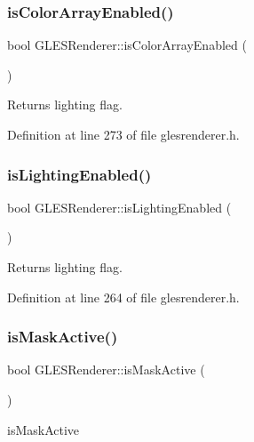 \subsubsection{\texorpdfstring{isColorArrayEnabled()}{isColorArrayEnabled()}}
{\footnotesize\ttfamily bool G\+L\+E\+S\+Renderer\+::is\+Color\+Array\+Enabled (\begin{DoxyParamCaption}{ }\end{DoxyParamCaption})\hspace{0.3cm}{\ttfamily [inline]}}

Returns lighting flag. 

Definition at line 273 of file glesrenderer.\+h.

\mbox{\label{class_g_l_e_s_renderer_a72a9b248926c08a45dfea70b8f0e22ca}} 
\subsubsection{\texorpdfstring{isLightingEnabled()}{isLightingEnabled()}}
{\footnotesize\ttfamily bool G\+L\+E\+S\+Renderer\+::is\+Lighting\+Enabled (\begin{DoxyParamCaption}{ }\end{DoxyParamCaption})\hspace{0.3cm}{\ttfamily [inline]}}

Returns lighting flag. 

Definition at line 264 of file glesrenderer.\+h.

\mbox{\label{class_g_l_e_s_renderer_a256990132d3f0ceff02a369db1361c2c}} 
\subsubsection{\texorpdfstring{isMaskActive()}{isMaskActive()}}
{\footnotesize\ttfamily bool G\+L\+E\+S\+Renderer\+::is\+Mask\+Active (\begin{DoxyParamCaption}{ }\end{DoxyParamCaption})\hspace{0.3cm}{\ttfamily [inline]}}



is\+Mask\+Active 

